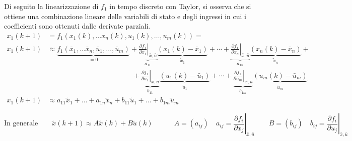 \vspace{10pt}
\noindent
Di seguito la linearizzazione di \(f_1\) in tempo discreto con Taylor, si osserva che si ottiene una combinazione lineare delle
variabili di stato e degli ingressi in cui i coefficienti sono ottenuti dalle derivate parziali.
\begin{align*}
	x_1(k+1) &= f_1(x_1(k), \dots x_n(k), u_1(k), \dots, u_m(k)) = \\
	x_1(k+1) &\approx \underbrace{f_1(\bar{x}_1, \dots \bar{x}_n, \bar{u}_1, \dots, \bar{u}_m)}_{=0} + \underbrace{ \left. \frac{\partial f_1}{\partial x_1} \right|_{\bar{x}, \bar{u}} }_{{a_{11}}} \underbrace{ \left( x_1(k) - \bar{x}_1 \right) }_{\tilde{x}_1} + \cdots + \underbrace{ \left. \frac{\partial f_1}{\partial x_n} \right|_{\bar{x}, \bar{u}} }_{a_{1n}} \underbrace{ \left( x_n(k) - \bar{x}_n \right) }_{\tilde{x}_n} + \\
	&\qquad\qquad\qquad\qquad\qquad\qquad + \underbrace{ \left. \frac{\partial f_1}{\partial u_1} \right|_{\bar{x}, \bar{u}} }_{{b_{11}}} \underbrace{ \left( u_1(k) - \bar{u}_1 \right) }_{\tilde{u}_1} + \cdots + \underbrace{ \left. \frac{\partial f_1}{\partial u_m} \right|_{\bar{x}, \bar{u}} }_{b_{1m}} \underbrace{ \left( u_m(k) - \bar{u}_m \right) }_{\tilde{u}_m} \\
	x_1(k+1) &\approx a_{11} \tilde{x}_1 + \dots + a_{1n} \tilde{x}_n + b_{11} \tilde{u}_1 + \dots + b_{1m} \tilde{u}_m
\end{align*}

\[\text{In generale} \qquad \tilde{x}(k+1) \approx A \tilde{x}(k) + B \tilde{u}(k) \qquad\quad A = (a_{ij}) \quad a_{ij} = \left. \frac{\partial f_i}{\partial x_j} \right|_{\bar{x}, \bar{u}} \qquad B = (b_{ij}) \quad b_{ij} = \left. \frac{\partial f_i}{\partial u_j} \right|_{\bar{x}, \bar{u}}\]
